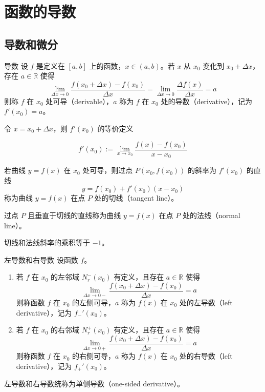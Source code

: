 \chapter{函数的导数}


\section{导数和微分}
\begin{definition}{导数}
    设 $f$ 是定义在 $[a, b]$ 上的函数，$x\in (a, b)$。若 $x$ 从 $x_0$ 变化到 $x_0 + \Delta x$，存在 $a\in \mathbb{R}$ 使得
    \[\lim_{\Delta x\to 0}\frac{f(x_0+\Delta x) - f(x_0)}{\Delta x} = \lim_{\Delta x\to 0}\frac{\Delta f(x)}{\Delta x} = a\]
    则称 $f$ 在 $x_0$ 处可导（derivable），$a$ 称为 $f$ 在 $x_0$ 处的导数（derivative），记为 $f'(x_0) = a$。
\end{definition}

令 $x = x_0 + \Delta x$，则 $f'(x_0)$ 的等价定义

\[f'(x_0) := \lim_{x\to x_0}\frac{f(x) - f(x_0)}{x - x_0}\]

\begin{definition}
    若曲线 $y = f(x)$ 在 $x_0$ 处可导，则过点 $P(x_0, f(x_0))$ 的斜率为 $f'(x_0)$ 的直线
    \[y = f(x_0) + f'(x_0)(x - x_0)\]
    称为曲线 $y = f(x)$ 在点 $P$ 处的切线（tangent line）。

    过点 $P$ 且垂直于切线的直线称为曲线 $y = f(x)$ 在点 $P$ 处的法线（normal line）。

    切线和法线斜率的乘积等于 $-1$。
\end{definition}


\begin{definition}{左导数和右导数}
    设函数 $f$。
    \begin{enumerate}
        \item 若 $f$ 在 $x_0$ 的左邻域 $N_r^-(x_0)$ 有定义，且存在 $a\in \mathbb{R}$ 使得
              \[\lim_{\Delta x\to 0-}\frac{f(x_0+\Delta x) - f(x_0)}{\Delta x} = a\]
              则称函数 $f$ 在 $x_0$ 的左侧可导，$a$ 称为 $f(x)$ 在 $x_0$ 处的左导数（left derivative），记为 $f_{-}'(x_0)$。
        \item 若 $f$ 在 $x_0$ 的右邻域 $N_r^+(x_0)$ 有定义，且存在 $a\in \mathbb{R}$ 使得
              \[\lim_{\Delta x\to 0+}\frac{f(x_0+\Delta x) - f(x_0)}{\Delta x} = a\]
              则称函数 $f$ 在 $x_0$ 的右侧可导，$a$ 称为 $f(x)$ 在 $x_0$ 处的右导数（left derivative），记为 $f_{+}'(x_0)$。
    \end{enumerate}
    左导数和右导数统称为单侧导数（one-sided derivative）。
\end{definition}


